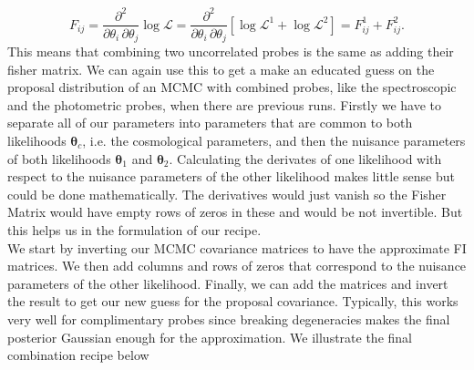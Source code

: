 \documentclass[oneside]{book}
\begin{document}
\begin{equation}
    F_{ij} = \frac{\partial^2}{\partial \theta_i\,\partial \theta_j} \log \mathcal{L} = \frac{\partial^2}{\partial \theta_i\,\partial \theta_j} \left[\log \mathcal{L}^1 + \log\mathcal{L}^2\right] = F^1_{ij} + F^2_{ij}.
\end{equation}
This means that combining two uncorrelated probes is the same as adding their fisher matrix. We can again use this to get a make an educated guess on the proposal distribution of an MCMC with combined probes, like the spectroscopic and the photometric probes, when there are previous runs. Firstly we have to separate all of our parameters into parameters that are common to both likelihoods $\boldsymbol{\theta}_c$, i.e. the cosmological parameters, and then the nuisance parameters of both likelihoods $\boldsymbol{\theta}_1$ and $\boldsymbol{\theta}_2$. Calculating the derivates of one likelihood with respect to the nuisance parameters of the other likelihood makes little sense but could be done mathematically. The derivatives would just vanish so the Fisher Matrix would have empty rows of zeros in these and would be not invertible. But this helps us in the formulation of our recipe.\\
We start by inverting our MCMC covariance matrices to have the approximate FI matrices. We then add columns and rows of zeros that correspond to the nuisance parameters of the other likelihood. Finally, we can add the matrices and invert the result to get our new guess for the proposal covariance. Typically, this works very well for complimentary probes since breaking degeneracies makes the final posterior Gaussian enough for the approximation. We illustrate the final combination recipe below 
\end{document}
